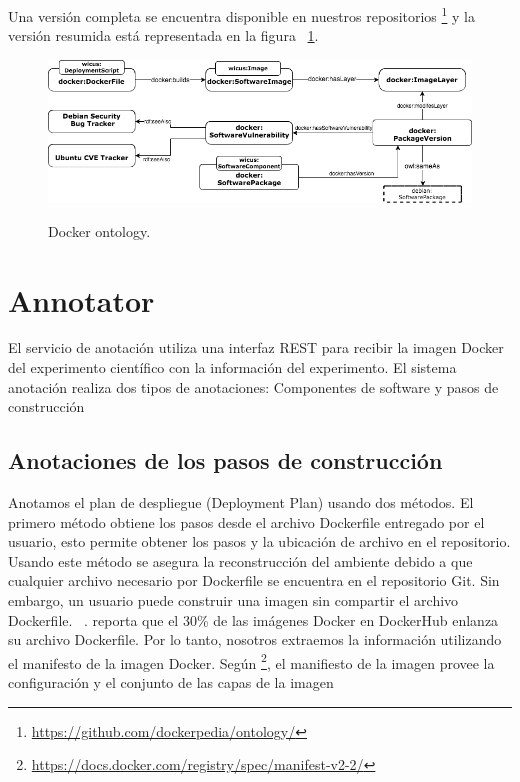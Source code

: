 Una versión completa se encuentra disponible en nuestros repositorios \footnote{\url{https://github.com/dockerpedia/ontology/}} y la versión resumida está representada en la figura ~\ref{fig:ontology}. 

\begin{figure}
  \caption{Docker ontology.}
  \centering
    \includegraphics[width=1\textwidth]{Figures/dockerOntologyBasic.png}
    \label{fig:ontology}
\end{figure}



\section{Annotator}\label{s4.2}

El servicio de anotación utiliza una interfaz REST para recibir la imagen Docker del experimento científico con la información del experimento. El sistema anotación realiza dos tipos de anotaciones: Componentes de software y pasos de construcción 

\subsection{Anotaciones de los pasos de construcción}\label{s4.2.1}

Anotamos el plan de despliegue (Deployment Plan) usando dos métodos. El primero método obtiene los pasos desde el archivo Dockerfile entregado por el usuario, esto permite obtener los pasos y la ubicación de archivo en el repositorio. 
Usando este método se asegura la reconstrucción del ambiente debido a que cualquier archivo necesario por Dockerfile se encuentra en el repositorio Git.
Sin embargo, un usuario puede construir una imagen sin compartir el archivo Dockerfile. ~\cite{}. reporta que el 30\% de las imágenes Docker en DockerHub enlanza su archivo Dockerfile. 
Por lo tanto, nosotros extraemos la información utilizando el manifesto de la imagen Docker. Según \footnote{\url{https://docs.docker.com/registry/spec/manifest-v2-2/}}, el manifiesto de la imagen provee la configuración y el conjunto de las capas de la imagen

